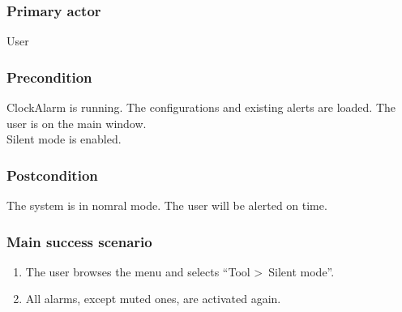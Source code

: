 \subsubsection{Primary actor}
User
\subsubsection{Precondition}
ClockAlarm is running. The configurations and existing alerts are loaded. The user is on the main window.
\\Silent mode is enabled.
\subsubsection{Postcondition}
The system is in nomral mode. The user will be alerted on time.
\subsubsection{Main success scenario}
\begin{enumerate}
	\item The user browses the menu and selects ``Tool \textgreater~Silent mode''.
	\item All alarms, except muted ones, are activated again.
\end{enumerate}
